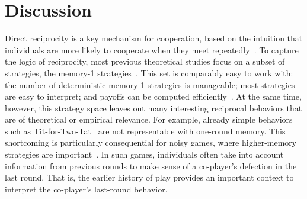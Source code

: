 \documentclass[9pt,twocolumn,twoside]{pnas-new}
\begin{document}
       


\section*{Discussion}

Direct reciprocity is a key mechanism for cooperation, based on the intuition that individuals are more likely to cooperate when they meet repeatedly~\citep{nowak:Science:2006}.
To capture the logic of reciprocity, most previous theoretical studies focus on a subset of strategies, the  memory-1 strategies~\citep{nowak:Nature:1993,imhof:PNAS:2005,grujic:jtb:2012,van-segbroeck:prl:2012,press:PNAS:2012,stewart:pnas:2013,Toupo:IJBC:2014,stewart:pnas:2014, akin:EGADS:2016,glynatsi:scientific:2020,chen:PNASnexus:2023}. 
This set is comparably easy to work with: 
the number of deterministic memory-1 strategies is manageable; most strategies are easy to interpret; and payoffs can be computed efficiently~\citep{sigmund2010}. 
At the same time, however, this strategy space leaves out many interesting reciprocal behaviors that are of theoretical or empirical relevance.
For example, already simple behaviors such as Tit-for-Two-Tat~\citep{axelrod:AAAS:1981} are not representable with one-round memory.
This shortcoming is particularly consequential for noisy games, where higher-memory strategies are important~\cite{fudenberg:AER:2012}. 
In such games, individuals often take into account information from previous rounds to make sense of a co-player's defection in the last round. 
That is, the earlier history of play provides an important context to interpret the co-player's last-round behavior. 
\end{document}
